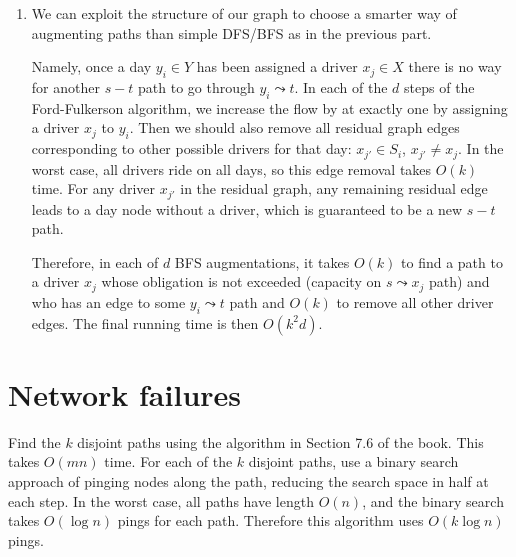 \documentclass[12pt]{article}
\begin{document}
\begin{enumerate}
\item %
We can exploit the structure of our graph to choose a smarter way of
augmenting paths than simple DFS/BFS as in the previous part.

Namely, once a day $y_i \in Y$ has been assigned a driver
$x_j \in X$ there is no way for another $s-t$ path to go through
$y_i \leadsto t$.
In each of the $d$ steps of the Ford-Fulkerson algorithm, we increase
the flow by at exactly one by assigning a driver $x_j$ to $y_i$.
Then we should also remove all residual graph edges corresponding to other
possible drivers for that day: $x_{j'} \in S_i$, $x_{j'} \ne x_j$.
In the worst case, all drivers ride on
all days, so this edge removal takes $O(k)$ time.
For any driver $x_{j'}$ in
the residual graph, any remaining residual edge leads to a day node
without a driver, which is guaranteed to be a new $s-t$ path.

Therefore, in each of $d$ BFS augmentations,
it takes $O(k)$ to find a path to a driver $x_j$ whose
obligation is not exceeded (capacity on $s \leadsto x_j$ path)
and who has
an edge to some $y_i \leadsto t$ path and $O(k)$ to remove all other
driver edges.
The final running time is then $O(k^2d)$.

\end{enumerate}

\pagebreak

\section{Network failures}

Find the $k$ disjoint paths using the algorithm in Section 7.6 of the
book. This takes $O(mn)$ time. For each of the $k$ disjoint paths,
use a binary search approach of pinging nodes along the path,
reducing the search space in half at each step. In the worst case,
all paths have length $O(n)$, and the binary search takes $O(\log{n})$ pings
for each path.
Therefore this algorithm uses $O(k\log{n})$ pings.

\pagebreak

\end{document}
